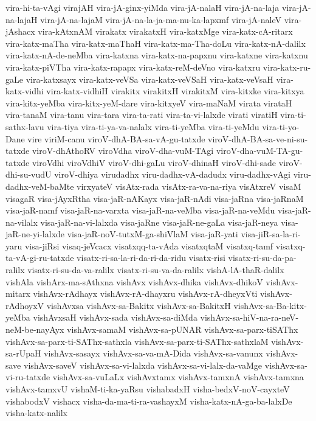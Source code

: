 {vira-hi-ta-vAgi
virajAH
vira-jA-ginx-yiMda
vira-jA-nalaH
vira-jA-na-laja
vira-jA-na-lajaH
vira-jA-na-lajaM
vira-jA-na-la-ja-ma-nu-ka-lapxmf
vira-jA-naleV
vira-jAshacx
vira-kAtxnAM
virakatx
virakatxH
vira-katxMge
vira-katx-cA-ritarx
vira-katx-maTha
vira-katx-maThaH
vira-katx-ma-Tha-doLu
vira-katx-nA-dalilx
vira-katx-nA-de-neMba
vira-katxna
vira-katx-na-papxnu
vira-katxne
vira-katxnu
vira-katx-piVTha
vira-katx-rapapx
vira-katx-reM-deVno
vira-katxru
vira-katx-ru-gaLe
vira-katxsayx
vira-katx-veVSa
vira-katx-veVSaH
vira-katx-veVsaH
vira-katx-vidhi
vira-katx-vidhiH
virakitx
virakitxH
virakitxM
vira-kitxke
vira-kitxya
vira-kitx-yeMba
vira-kitx-yeM-dare
vira-kitxyeV
vira-maNaM
virata
virataH
vira-tanaM
vira-tanu
vira-tara
vira-ta-rati
vira-ta-vi-lalxde
virati
viratiH
vira-ti-sathx-lavu
vira-tiya
vira-ti-ya-va-nalalx
vira-ti-yeMba
vira-ti-yeMdu
vira-ti-yo-Dane
vire
viriM-canu
viroV-dhA-BA-sa-vA-gu-tatxde
viroV-dhA-BA-sa-ve-ni-su-tatxde
viroV-dhAthoRV
viroVdha
viroV-dha-vuM-TAgi
viroV-dha-vuM-TA-gu-tatxde
viroVdhi
viroVdhiV
viroV-dhi-gaLu
viroV-dhinaH
viroV-dhi-sade
viroV-dhi-su-vudU
viroV-dhiya
virudadhx
viru-dadhx-vA-dadudx
viru-dadhx-vAgi
viru-dadhx-veM-baMte
virxyateV
visAtx-rada
visAtx-ra-va-na-riya
visAtxreV
visaM
visagaR
visa-jAyxRtha
visa-jaR-nAKayx
visa-jaR-nAdi
visa-jaRna
visa-jaRnaM
visa-jaR-namf
visa-jaR-na-varxta
visa-jaR-na-veMba
visa-jaR-na-veMdu
visa-jaR-na-vilalx
visa-jaR-na-vi-lalxda
visa-jaRne
visa-jaR-ne-gaLa
visa-jaR-neya
visa-jaR-ne-yi-lalxde
visa-jaR-noV-tutxM-ga-shiVlaM
visa-jaR-yati
visa-jiR-sa-la-ri-yaru
visa-jiRsi
visaq-jeVcacx
visatxqq-ta-vAda
visatxqtaM
visatxq-tamf
visatxq-ta-vA-gi-ru-tatxde
visatx-ri-sa-la-ri-da-ri-da-ridu
visatx-risi
visatx-ri-su-da-pa-ralilx
visatx-ri-su-da-va-ralilx
visatx-ri-su-va-da-ralilx
vishA-lA-thaR-dalilx
vishAla
vishArx-ma-sAthxna
vishAvx
vishAvx-dhika
vishAvx-dhikoV
vishAvx-mitarx
vishAvx-rAdhayx
vishAvx-rA-dhayxru
vishAvx-rA-dheyxVti
vishAvx-rAdhoyxV
vishAvxsa
vishAvx-sa-Bakitx
vishAvx-sa-BakitxH
vishAvx-sa-Ba-kitx-yeMba
vishAvxsaH
vishAvx-sada
vishAvx-sa-diMda
vishAvx-sa-hiV-na-ra-neV-neM-be-nayAyx
vishAvx-samaM
vishAvx-sa-pUNAR
vishAvx-sa-parx-tiSAThx
vishAvx-sa-parx-ti-SAThx-sathxla
vishAvx-sa-parx-ti-SAThx-sathxlaM
vishAvx-sa-rUpaH
vishAvx-sasayx
vishAvx-sa-va-mA-Dida
vishAvx-sa-vanunx
vishAvx-save
vishAvx-saveV
vishAvx-sa-vi-lalxda
vishAvx-sa-vi-lalx-da-vaMge
vishAvx-sa-vi-ru-tatxde
vishAvx-sa-vuLaLx
vishAvxtamx
vishAvx-tamxnA
vishAvx-tamxna
vishAvx-tamxvU
vishaM-ti-ka-yaRsu
vishabadxH
visha-bedxV-noV-cayxteV
vishabodxV
vishacx
visha-da-ma-ti-ra-vashayxM
visha-katx-nA-ga-ba-lalxDe
visha-katx-nalilx
}
